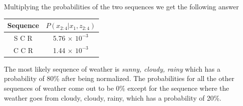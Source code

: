 \documentclass[answers]{exam}
\begin{document}
\begin{questions}
\begin{parts}
\begin{solution}
            Multiplying the probabilities of the two sequences we get the following answer

            \newpage

            \begin{tabular}[h]{|c|c|}
                \hline
                Sequence & $P(x_{2:4}|x_1, z_{2:4})$ \\
                \hline
                S C R    & 5.76 $\times$ $10^{-3}$   \\
                \hline
                C C R    & 1.44 $\times$ $10^{-3}$   \\
                \hline
            \end{tabular}

            The most likely sequence of weather is \textit{sunny, cloudy, rainy} which has
            a probability of 80\% after being normalized. The probabilities for all the
            other sequences of weather come out to be 0\% except for the sequence where the
            weather goes from cloudy, cloudy, rainy, which has a probability of 20\%.
        \end{solution}
    \end{parts}

    \question[20]
\end{questions}
\end{document}
